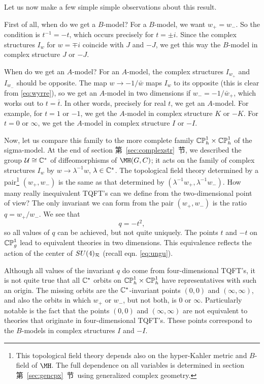\par{}

Let us now make a few simple simple observations about this
result.

First of all, when do we get a $B$-model?  For a $B$-model, we
want $w_+=w_-$.  So the condition is $t^{-1}=-t$, which occurs
precisely for $t=\pm i$.  Since the complex structures $I_w$ for
$w=\mp i$ coincide with $J$ and $-J$, we get this way the
$B$-model in complex structure $J$ or $-J$.

When do we get an $A$-model?  For an $A$-model, the complex
structures $I_{w_+}$ and $I_{w_-}$ should be opposite.  The map
$w\to -1/\bar w$ maps $I_w$ to its opposite (this is clear from
\eqref{eq:wyrre}), so we get an $A$-model in two dimensions if $w_-=-1/\bar
w_+$, which works out to $t=\bar t$.  In other words, precisely
for real $t$, we get an $A$-model.  For example, for $t=1$ or
$-1$, we get the $A$-model in complex structure $K$ or $-K$.  For
$t=0$ or $\infty$, we get the $ A$-model in complex structure $I$
or $-I$.

Now, let us compare this family to the more complete family
$\Bbb{CP}_h^1\times \Bbb{CP}_h^1$ of the sigma-model.  At the end
of section 第~\ref{sec:complexstr}~节, we described the group ${\cal U}\cong
\Bbb{C}^*$ of diffeomorphisms of $\MH(G,C)$; it acts on the family
of complex structures $I_w$ by $w\to \lambda^{-1} w$, $\lambda\in
\Bbb{C}^*$.   The topological field theory determined by a
pair\footnote{This topological field theory depends also on the
hyper-Kahler metric and $B$-field of $\MH$.  The full dependence
on all variables is determined in section 第~\ref{sec:gencpx}~节\ using
generalized complex geometry.} $(w_+,w_-)$ is the same as that
determined by $(\lambda^{-1} w_+,\lambda^{-1} w_-)$. How many
really inequivalent TQFT's can we define from the two-dimensional
point of view?  The only invariant we can form from the pair
$(w_+,w_-)$ is the ratio $q=w_+/w_-$. We see that
\begin{equation*}
\tag*{(5.12)}
q=-t^2,
\end{equation*}
 so all values of $q$ can be achieved, but not
quite uniquely.  The points $t$ and $-t $ on $\Bbb{CP}^1_g$ lead
to equivalent theories in two dimensions. This equivalence
reflects the action of the center of $SU(4)_{\cal R}$ (recall eqn.
\eqref{eq:ungu}).

Although all values of the invariant $q$ do come from
four-dimensional TQFT's, it is not quite true that all $\Bbb{C}^*$
orbits on $\Bbb{CP}_h^1\times \Bbb{CP}_h^1$ have representatives
with such an origin.  The missing orbits are the
$\Bbb{C}^*$-invariant points  $(0,0)$ and $(\infty,\infty)$, and
also the orbits in which $w_+$ or $w_-$, but not both, is 0 or
$\infty$. Particularly notable is the fact that the points $(0,0)$
and $(\infty,\infty)$ are not equivalent to theories that
originate in four-dimensional TQFT's. These points correspond to
the $B$-models in complex structures $I$ and $-I$.

